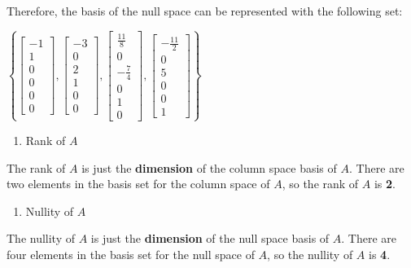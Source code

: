 \documentclass[
  letterpaper,
  DIV=11,
  numbers=noendperiod]{scrartcl}
\providecommand{\tightlist}{%
  \setlength{\itemsep}{0pt}\setlength{\parskip}{0pt}}\usepackage{longtable,booktabs,array}
\begin{document}
\newpage{}

Therefore, the basis of the null space can be represented with the
following set:

\(\left\{\begin{bmatrix}-1 \\ 1 \\ 0 \\ 0 \\ 0 \\ 0\end{bmatrix}, \begin{bmatrix}-3 \\ 0 \\ 2 \\ 1 \\ 0 \\ 0\end{bmatrix}, \begin{bmatrix}\frac{11}{8}\\ 0 \\ -\frac{7}{4} \\ 0 \\ 1 \\ 0\end{bmatrix}, \begin{bmatrix}-\frac{11}{2} \\ 0 \\ 5 \\ 0 \\ 0 \\ 1\end{bmatrix}\right\}\)

\begin{enumerate}
\def\labelenumi{\alph{enumi}.}
\setcounter{enumi}{3}
\tightlist
\item
  Rank of \(A\)
\end{enumerate}

The rank of \(A\) is just the \textbf{dimension} of the column space
basis of \(A\). There are two elements in the basis set for the column
space of \(A\), so the rank of \(A\) is \textbf{2}.

\begin{enumerate}
\def\labelenumi{\alph{enumi}.}
\setcounter{enumi}{4}
\tightlist
\item
  Nullity of \(A\)
\end{enumerate}

The nullity of \(A\) is just the \textbf{dimension} of the null space
basis of \(A\). There are four elements in the basis set for the null
space of \(A\), so the nullity of \(A\) is \textbf{4}.
\end{document}
